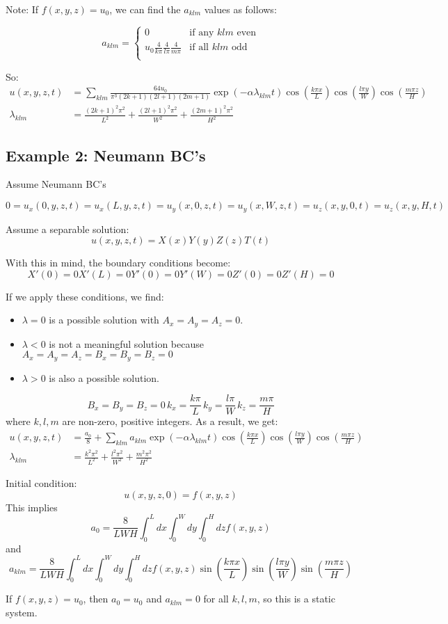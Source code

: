 \documentclass{article}
\begin{document}
Note: If $f(x,y,z) = u_0$, we can find the $a_{klm}$ values as follows:

\[
  a_{klm}=
  \begin{cases}
    0 & \text{if any } klm \text{ even} \\
    u_0\frac{4}{k\pi}\frac{4}{l\pi}\frac{4}{m\pi} & \text{if all } klm \text{ odd} \\
  \end{cases}
\]

So:
\begin{align*}
  u(x,y,z,t) &= \sum_{klm} \frac{64u_0}{\pi^3(2k+1)(2l+1)(2m+1)} \exp\left(-\alpha\lambda_{klm}t\right)
               \cos\left(\frac{k\pi x}{L}\right) \cos\left(\frac{l\pi y}{W}\right)
               \cos\left(\frac{m\pi z}{H}\right) \\
  \lambda_{klm} &= \frac{(2k+1)^2\pi^2}{L^2} + \frac{(2l+1)^2\pi^2}{W^2} + \frac{(2m+1)^2\pi^2}{H^2}
\end{align*}


\subsection{Example 2: Neumann BC's}
Assume Neumann BC's

$$
0 = u_x(0,y,z,t) = u_x(L,y,z,t) = u_y(x,0,z,t) = u_y(x,W,z,t) = u_z(x,y,0,t) = u_z(x,y,H,t)
$$

Assume a separable solution:
$$
u(x,y,z,t) = X(x)Y(y)Z(z)T(t)
$$

With this in mind, the boundary conditions become:
\[
  X'(0) = 0
  X'(L) = 0
  Y'(0) = 0
  Y'(W) = 0
  Z'(0) = 0
  Z'(H) = 0
\]

If we apply these conditions, we find:
\begin{itemize}
  \item $\lambda = 0$ is a possible solution with $A_x=A_y=A_z=0$.
  \item $\lambda < 0$ is not a meaningful solution because $A_x=A_y=A_z=B_x=B_y=B_z=0$
  \item $\lambda > 0$ is also a possible solution.
\end{itemize}
\[
  B_x = B_y = B_z = 0 \, k_x=\frac{k\pi}{L} \, k_y = \frac{l\pi}{W} \, k_z = \frac{m\pi}{H}
\]
where $k,l,m$ are non-zero, positive integers. As a result, we get:
\begin{align*}
  u(x,y,z,t) &= \frac{a_0}{8} + \sum_{klm} a_{klm}\exp\left(-\alpha\lambda_{klm}t\right)
               \cos\left(\frac{k\pi x}{L}\right) \cos\left(\frac{l\pi y}{W}\right)
               \cos\left(\frac{m\pi z}{H}\right) \\
  \lambda_{klm} &= \frac{k^2\pi^2}{L^2} + \frac{l^2\pi^2}{W^2} + \frac{m^2\pi^2}{H^2}
\end{align*}

Initial condition:
\[
  u(x,y,z,0) = f(x,y,z)
\]
This implies
\[
  a_0 = \frac{8}{LWH}\int_0^L dx \int_0^W dy \int_0^H dz f(x,y,z)
\]
and
\[
  a_{klm} = \frac{8}{LWH}\int_0^L dx \int_0^W dy \int_0^H dz f(x,y,z) \sin\left(\frac{k\pi
      x}{L}\right) \sin\left(\frac{l\pi y}{W}\right) \sin\left(\frac{m\pi z}{H}\right)
\]

If $f(x,y,z) = u_0$, then $a_0 = u_0$ and $a_{klm} = 0$ for all $k,l,m$, so this is a static
system.
\end{document}
